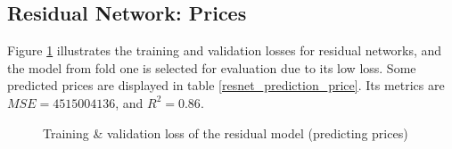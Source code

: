 \documentclass[12pt,twoside]{report}
\begin{document}
\subsection{Residual Network: Prices}
Figure \ref{all_resnet_full_epoch_1000} illustrates the training and validation losses for residual networks, and the model from fold one is selected for evaluation due to its low loss. Some predicted prices are displayed in table \ref{resnet_prediction_price}. Its metrics are $MSE = 4515004136$, and $R^2 = 0.86$. 
\begin{figure}[!htbp]
	\centering
	\hfill
	\hfill
	\hfil
	\hfil
	\caption{Training \& validation loss of the residual model (predicting prices)}
	\label{all_resnet_full_epoch_1000}
\end{figure}
\end{document}
